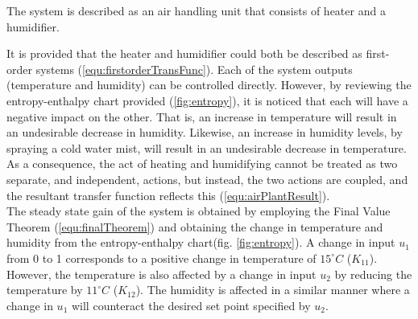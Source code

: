 \documentclass[a4paper, titlepage]{article}
\begin{document}


The system is described as an air handling unit that consists of heater and a humidifier.

It is provided that the heater and humidifier could both be described as first-order systems (\ref{equ:firstorderTransFunc}).
Each of the system outputs (temperature and humidity) can be controlled directly.  
However, by reviewing the entropy-enthalpy chart provided (\ref{fig:entropy}), it is noticed that each will have a negative impact on the other.  
That is, an increase in temperature will result in an undesirable decrease in humidity.  
Likewise, an increase in humidity levels, by spraying a cold water mist, will result in an undesirable decrease in temperature.\\

As a consequence, the act of heating and humidifying cannot be treated as two separate, and independent, actions, but instead, the two actions are coupled, and the resultant transfer function reflects this (\ref{equ:airPlantResult}).\\

The steady state gain of the system is obtained by employing the Final Value Theorem (\ref{equ:finalTheorem}) and obtaining the change in temperature and humidity from the entropy-enthalpy chart(fig. \ref{fig:entropy}).  A change in input $u_1$ from 0 to 1 corresponds to a positive change in temperature of $15^\circ C$ ($K_{11}$).  However, the temperature is also affected by a change in input $u_2$ by reducing the temperature by $11^\circ C$ ($K_{12}$).  The humidity is affected in a similar manner where a change in $u_1$ will counteract the desired set point specified by $u_2$.       

\end{document}
